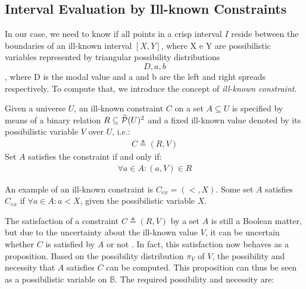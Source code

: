 %
%


\subsection{\label{subsec:interval-evaluation-by-ill-known-constraints}Interval Evaluation by Ill-known Constraints}
In our case, we need to know if all points in a crisp interval $I$ reside between the boundaries of an ill-known interval $\left[ X , Y \right]$, where X e Y are possibilistic variables represented by triangular possibility distributions \[D,a,b\], where D is the modal value and a and b are the left and right spreads respectively. To compute that, we introduce the concept of \emph{ill-known constraint}\cite{Pons2011}.




\begin{definition}
Given a universe $U$, an ill-known constraint $C$ on a set $A \subseteq U$ is specified by means of a binary relation $R \subseteq  \widetilde{\mathcal{P}}(U)^{2}$ and a fixed ill-known value denoted by its possibilistic variable $V$ over $U$, i.e.:
\begin{align}
\label{eq:ill-known-constraint}
C \triangleq (R,V)
\end{align}
Set $A$ satisfies the constraint if and only if:
\begin{align}
\forall a \in A : (a,V) \in R
\end{align}
\end{definition}

An example of an ill-known constraint is $C_{ex} = (<, X)$. Some set $A$ satisfies $C_{ex}$ if $\forall a \in A : a < X$, given the possibilistic variable $X$.

The satisfaction of a constraint $C \triangleq (R,V)$ by a set $A$ is still a Boolean matter, but due to the uncertainty about the ill-known value $V$, it can be uncertain whether $C$ is satisfied by $A$ or not \cite{Pons2011}. In fact, this satisfaction now behaves as a proposition. Based on the possibility distribution $\pi_{V}$ of $V$, the possibility and necessity that $A$ satisfies $C$ can be computed. This proposition can thus be seen as a possibilistic variable on $\mathbb{B}$. The required possibility and necessity are:

